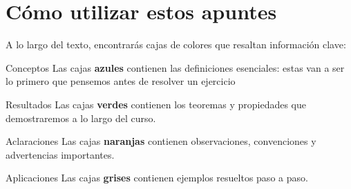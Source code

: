 \documentclass[11pt, oneside]{book}
\begin{document}
\section*{Cómo utilizar estos apuntes}

A lo largo del texto, encontrarás cajas de colores que resaltan información clave:

\begin{dfn}{Conceptos}
    Las cajas \textbf{azules} contienen las definiciones esenciales: estas van a ser lo primero que pensemos antes de resolver un ejercicio
\end{dfn}

\begin{teor}{Resultados}
    Las cajas \textbf{verdes} contienen los teoremas y propiedades que demostraremos a lo largo del curso.
\end{teor}

\begin{obs}{Aclaraciones}
    Las cajas \textbf{naranjas} contienen observaciones, convenciones y advertencias importantes.
\end{obs}

\begin{ejem}{Aplicaciones}
    Las cajas \textbf{grises} contienen ejemplos resueltos paso a paso.
\end{ejem}



\mainmatter





% 



\backmatter

% 
% 
\end{document}
